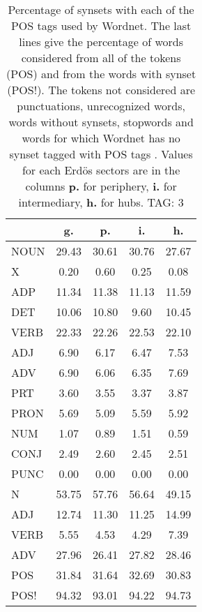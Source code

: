 \begin{table}[h!]
\begin{center}
\begin{tabular}{| l || c | c | c | c |}\hline
 & {\bf g.} & {\bf p.} & {\bf i.} & {\bf h.} \\\hline\hline
NOUN & 29.43  & 30.61  & 30.76  & 27.67 \\
X & 0.20  & 0.60  & 0.25  & 0.08 \\\hline
ADP & 11.34  & 11.38  & 11.13  & 11.59 \\
DET & 10.06  & 10.80  & 9.60  & 10.45 \\\hline
VERB & 22.33  & 22.26  & 22.53  & 22.10 \\\hline
ADJ & 6.90  & 6.17  & 6.47  & 7.53 \\
ADV & 6.90  & 6.06  & 6.35  & 7.69 \\\hline
PRT & 3.60  & 3.55  & 3.37  & 3.87 \\
PRON & 5.69  & 5.09  & 5.59  & 5.92 \\
NUM & 1.07  & 0.89  & 1.51  & 0.59 \\
CONJ & 2.49  & 2.60  & 2.45  & 2.51 \\
PUNC & 0.00  & 0.00  & 0.00  & 0.00 \\\hline\hline\hline
N & 53.75  & 57.76  & 56.64  & 49.15 \\\hline
ADJ & 12.74  & 11.30  & 11.25  & 14.99 \\\hline
VERB & 5.55  & 4.53  & 4.29  & 7.39 \\\hline
ADV & 27.96  & 26.41  & 27.82  & 28.46 \\\hline\hline
POS & 31.84  & 31.64  & 32.69  & 30.83 \\\hline
POS! & 94.32  & 93.01  & 94.22  & 94.73 \\\hline
\end{tabular}
\caption{Percentage of synsets with each of the POS tags used by Wordnet. The last lines give the percentage of words considered from all of the tokens (POS) and from the words with synset (POS!). The tokens not considered are punctuations, unrecognized words, words without synsets, stopwords and words for which Wordnet has no synset  tagged with POS tags . Values for each Erd\"os sectors are in the columns {{\bf p.}} for periphery, {{\bf i.}} for intermediary, {{\bf h.}} for hubs. TAG: 3}
\end{center}
\end{table}